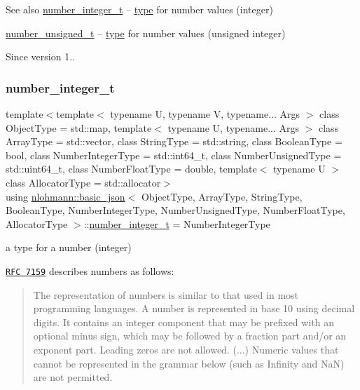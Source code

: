 \begin{DoxySeeAlso}{See also}
\hyperlink{classnlohmann_1_1basic__json_ac4b10b2364f26ce47bdb9a413ff04a59}{number\+\_\+integer\+\_\+t} -- \hyperlink{classnlohmann_1_1basic__json_a5d466b240d0ba9f648d7fd4ff42359f5}{type} for number values (integer)

\hyperlink{classnlohmann_1_1basic__json_a60a04166c122072ab11eaf9845d9cd1d}{number\+\_\+unsigned\+\_\+t} -- \hyperlink{classnlohmann_1_1basic__json_a5d466b240d0ba9f648d7fd4ff42359f5}{type} for number values (unsigned integer)
\end{DoxySeeAlso}
\begin{DoxySince}{Since}
version 1.. 
\end{DoxySince}
\hypertarget{classnlohmann_1_1basic__json_ac4b10b2364f26ce47bdb9a413ff04a59}{}\label{classnlohmann_1_1basic__json_ac4b10b2364f26ce47bdb9a413ff04a59} 
\subsubsection{\texorpdfstring{number\+\_\+integer\+\_\+t}{number\_integer\_t}}
{\footnotesize\ttfamily template$<$template$<$ typename U, typename V, typename... Args $>$ class Object\+Type = std\+::map, template$<$ typename U, typename... Args $>$ class Array\+Type = std\+::vector, class String\+Type  = std\+::string, class Boolean\+Type  = bool, class Number\+Integer\+Type  = std\+::int64\+\_\+t, class Number\+Unsigned\+Type  = std\+::uint64\+\_\+t, class Number\+Float\+Type  = double, template$<$ typename U $>$ class Allocator\+Type = std\+::allocator$>$ \\
using \hyperlink{classnlohmann_1_1basic__json}{nlohmann\+::basic\+\_\+json}$<$ Object\+Type, Array\+Type, String\+Type, Boolean\+Type, Number\+Integer\+Type, Number\+Unsigned\+Type, Number\+Float\+Type, Allocator\+Type $>$\+::\hyperlink{classnlohmann_1_1basic__json_ac4b10b2364f26ce47bdb9a413ff04a59}{number\+\_\+integer\+\_\+t} =  Number\+Integer\+Type}



a type for a number (integer) 

\href{http://rfc7159.net/rfc7159}{\tt R\+FC 7159} describes numbers as follows\+: \begin{quote}
The representation of numbers is similar to that used in most programming languages. A number is represented in base 10 using decimal digits. It contains an integer component that may be prefixed with an optional minus sign, which may be followed by a fraction part and/or an exponent part. Leading zeros are not allowed. (...) Numeric values that cannot be represented in the grammar below (such as Infinity and NaN) are not permitted. \end{quote}


